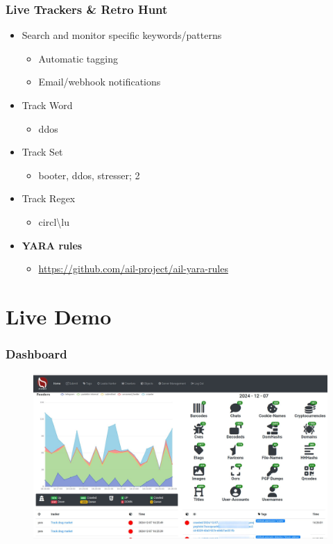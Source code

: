 \documentclass[10pt,aspectratio=169, colorlinks=true, linkcolor=circlBlue]{beamer}
\begin{document}
\begin{frame}
	\frametitle{Live Trackers \& Retro Hunt}
    \begin{itemize}
        \item Search and monitor specific keywords/patterns
        \begin{itemize}
            \item Automatic tagging
            \item Email/webhook notifications
        \end{itemize}
        \item Track Word
        \begin{itemize}
            \item ddos
        \end{itemize}
        \item Track Set
        \begin{itemize}
            \item booter, ddos, stresser; 2
        \end{itemize}
        \item Track Regex
        \begin{itemize}
            \item circl\textbackslash lu
        \end{itemize}
        \item {\bf YARA rules}
        \begin{itemize}
            \item \url{https://github.com/ail-project/ail-yara-rules}
        \end{itemize}
    \end{itemize}
\end{frame}

\section{Live Demo}

\begin{frame}
    \frametitle{Dashboard}
    \begin{figure}
        \includegraphics[scale=0.16, angle=0]{screenshot/dashboard.jpeg}
    \end{figure}
\end{frame}
\end{document}
